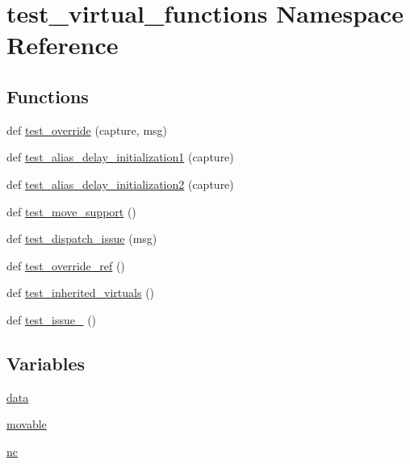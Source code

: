 \hypertarget{namespacetest__virtual__functions}{}\section{test\+\_\+virtual\+\_\+functions Namespace Reference}
\label{namespacetest__virtual__functions}
\subsection*{Functions}
\begin{DoxyCompactItemize}
\item 
def \mbox{\hyperlink{namespacetest__virtual__functions_aa4539dae52e563d1ade4fd68cef498a9}{test\+\_\+override}} (capture, msg)
\item 
def \mbox{\hyperlink{namespacetest__virtual__functions_a5c20eb78c5144f7798743969442c0d92}{test\+\_\+alias\+\_\+delay\+\_\+initialization1}} (capture)
\item 
def \mbox{\hyperlink{namespacetest__virtual__functions_a88181b0dea0f4aa4dc7c009f751fb3ff}{test\+\_\+alias\+\_\+delay\+\_\+initialization2}} (capture)
\item 
def \mbox{\hyperlink{namespacetest__virtual__functions_a5862679ba686c1dc509ad1598fab0ddb}{test\+\_\+move\+\_\+support}} ()
\item 
def \mbox{\hyperlink{namespacetest__virtual__functions_aebcdfe688eeefd3b788681e3cb9a69a2}{test\+\_\+dispatch\+\_\+issue}} (msg)
\item 
def \mbox{\hyperlink{namespacetest__virtual__functions_ad2ea910fc087a0a939c5c6110c7d6146}{test\+\_\+override\+\_\+ref}} ()
\item 
def \mbox{\hyperlink{namespacetest__virtual__functions_a6659077ad0a4b585ae2980928dfebcd5}{test\+\_\+inherited\+\_\+virtuals}} ()
\item 
def \mbox{\hyperlink{namespacetest__virtual__functions_a8c8dcdf2a75a72c51c420893d6a37e45}{test\+\_\+issue\+\_}} ()
\end{DoxyCompactItemize}
\subsection*{Variables}
\begin{DoxyCompactItemize}
\item 
\mbox{\hyperlink{namespacetest__virtual__functions_a61c029ceb93e50c3ef9d6a8446074a1b}{data}}
\item 
\mbox{\hyperlink{namespacetest__virtual__functions_a821b60036e2adf44623c392bbd6b0e64}{movable}}
\item 
\mbox{\hyperlink{namespacetest__virtual__functions_a4d08100f674b7d5f707cb856d4cef965}{nc}}
\end{DoxyCompactItemize}


